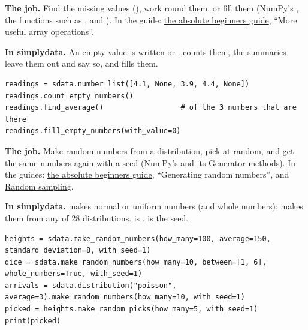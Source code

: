 
\textbf{The job.} Find the missing values (), work round them, or fill them (NumPy's
, the  functions such as , and ). In the guide:
\href{https://numpy.org/doc/stable/user/absolute_beginners.html}{the absolute beginners guide},
``More useful array operations''.

\textbf{In simplydata.} An empty value is written  or .
 counts them, the summaries leave them out and say so, and
 fills them.

\begin{lstlisting}[style=py]
readings = sdata.number_list([4.1, None, 3.9, 4.4, None])
readings.count_empty_numbers()
readings.find_average()                  # of the 3 numbers that are there
readings.fill_empty_numbers(with_value=0)
\end{lstlisting}


\textbf{The job.} Make random numbers from a distribution, pick at random, and get the same numbers
again with a seed (NumPy's  and its Generator methods). In the guides:
\href{https://numpy.org/doc/stable/user/absolute_beginners.html}{the absolute beginners guide},
``Generating random numbers'', and \href{https://numpy.org/doc/stable/reference/random/index.html}%
{Random sampling}.

\textbf{In simplydata.}  makes normal or uniform numbers (and whole
numbers);  makes them
from any of 28 distributions.  is . 
is the seed.

\begin{lstlisting}[style=py]
heights = sdata.make_random_numbers(how_many=100, average=150, standard_deviation=8, with_seed=1)
dice = sdata.make_random_numbers(how_many=10, between=[1, 6], whole_numbers=True, with_seed=1)
arrivals = sdata.distribution("poisson", average=3).make_random_numbers(how_many=10, with_seed=1)
picked = heights.make_random_picks(how_many=5, with_seed=1)
print(picked)
\end{lstlisting}


